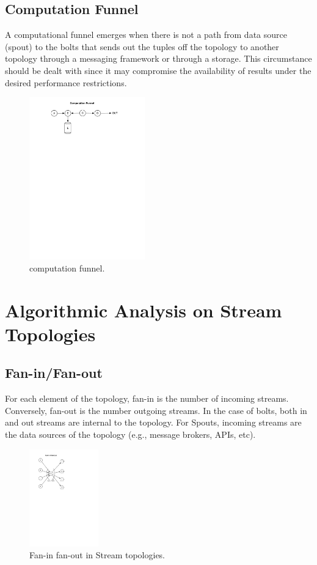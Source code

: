 \subsection{Computation Funnel}
A computational funnel emerges when there is not a path from data source (spout) to the bolts that sends out the tuples off the topology to another topology through a messaging framework or through a storage. This circumstance should be dealt with since it may compromise the availability of results under the desired performance restrictions.

\begin{figure}[H]
	\begin{center}
		\includegraphics[width=5cm]{images/funnel}
		\caption{computation funnel.}
		\label{fig:funnel}
	\end{center}
\end{figure}

\section{Algorithmic Analysis on Stream Topologies}\label{algo}

\subsection{Fan-in/Fan-out}

For each element of the topology, fan-in is the number of incoming
streams. Conversely, fan-out is the number outgoing streams. In the case of
bolts, both in and out streams are internal to the topology. For Spouts,
incoming streams are the data sources of the topology (e.g., message brokers,
APIs, etc).

\begin{figure}[H]
	\begin{center}
		\includegraphics[width=3cm]{images/fan-in-out}
		\caption{Fan-in fan-out in Stream topologies.}
		\label{fig:fan}
	\end{center}
\end{figure}

